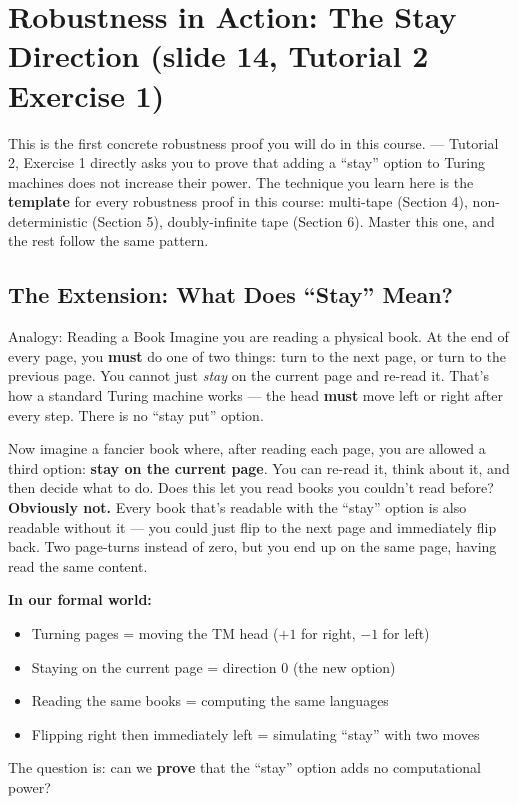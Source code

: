 \section{Robustness in Action: The Stay Direction (slide 14, Tutorial 2 Exercise 1)}

This is the first concrete robustness proof you will do in this course. \kemark{} --- Tutorial 2, Exercise 1 directly asks you to prove that adding a ``stay'' option to Turing machines does not increase their power. The technique you learn here is the \textbf{template} for every robustness proof in this course: multi-tape (Section 4), non-deterministic (Section 5), doubly-infinite tape (Section 6). Master this one, and the rest follow the same pattern.

\subsection{The Extension: What Does ``Stay'' Mean?}

\begin{notebox}{Analogy: Reading a Book}
Imagine you are reading a physical book. At the end of every page, you \textbf{must} do one of two things: turn to the next page, or turn to the previous page. You cannot just \textit{stay} on the current page and re-read it. That's how a standard Turing machine works --- the head \textbf{must} move left or right after every step. There is no ``stay put'' option.

Now imagine a fancier book where, after reading each page, you are allowed a third option: \textbf{stay on the current page}. You can re-read it, think about it, and then decide what to do. Does this let you read books you couldn't read before? \textbf{Obviously not.} Every book that's readable with the ``stay'' option is also readable without it --- you could just flip to the next page and immediately flip back. Two page-turns instead of zero, but you end up on the same page, having read the same content.

\textbf{In our formal world:}
\begin{itemize}[nosep]
\item Turning pages = moving the TM head ($+1$ for right, $-1$ for left)
\item Staying on the current page = direction $0$ (the new option)
\item Reading the same books = computing the same languages
\item Flipping right then immediately left = simulating ``stay'' with two moves
\end{itemize}

The question is: can we \textbf{prove} that the ``stay'' option adds no computational power?
\end{notebox}

